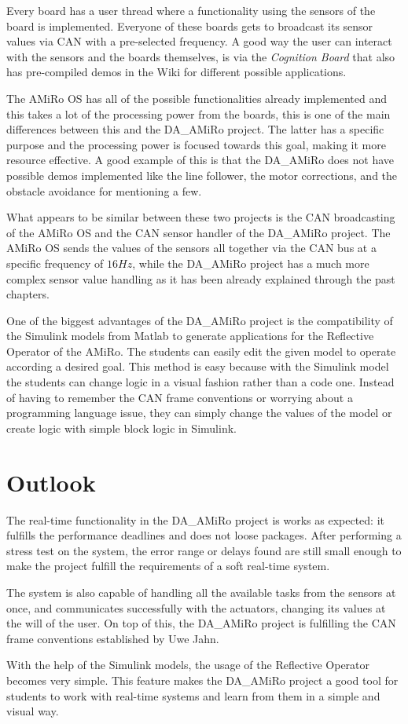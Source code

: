 \documentclass[12pt]{report}%
\begin{document}
Every board has a user thread where a functionality using the sensors of the board is implemented. Everyone of these boards gets to broadcast its sensor values via CAN with a pre-selected frequency. A good way the user can interact with the sensors and the boards themselves, is via the \textit{Cognition Board} that also has pre-compiled demos in the Wiki \cite{AMiRo_Murox} for different possible applications.

The AMiRo OS has all of the possible functionalities already implemented and this takes a lot of the processing power from the boards, this is one of the main differences between this and the DA\_AMiRo project. The latter has a specific purpose and the processing power is focused towards this goal, making it more resource effective. A good example of this is that the DA\_AMiRo does not have possible demos implemented like the line follower, the motor corrections, and the obstacle avoidance for mentioning a few.

What appears to be similar between these two projects is the CAN broadcasting of the AMiRo OS and the CAN sensor handler of the DA\_AMiRo project. The AMiRo OS sends the values of the sensors all together via the CAN bus at a specific frequency of $16Hz$, while the DA\_AMiRo project has a much more complex sensor value handling as it has been already explained through the past chapters.

One of the biggest advantages of the DA\_AMiRo project is the compatibility of the Simulink models from Matlab to generate applications for the Reflective Operator of the AMiRo. The students can easily edit the given model to operate according a desired goal. This method is easy because with the Simulink model the students can change logic in a visual fashion rather than a code one. Instead of having to remember the CAN frame conventions or worrying about a programming language issue, they can simply change the values of the model or create logic with simple block logic in Simulink.

\section{Outlook}
The real-time functionality in the DA\_AMiRo project is works as expected: it fulfills the performance deadlines and does not loose packages. After performing a stress test on the system, the error range or delays found are still small enough to make the project fulfill the requirements of a soft real-time system.

The system is also capable of handling all the available tasks from the sensors at once, and communicates successfully with the actuators, changing its values at the will of the user. On top of this, the DA\_AMiRo project is fulfilling the CAN frame conventions established by Uwe Jahn.

With the help of the Simulink models, the usage of the Reflective Operator becomes very simple. This feature makes the DA\_AMiRo project a good tool for students to work with real-time systems and learn from them in a simple and visual way.

\printbibliography
\nocite{*}
\end{document}
